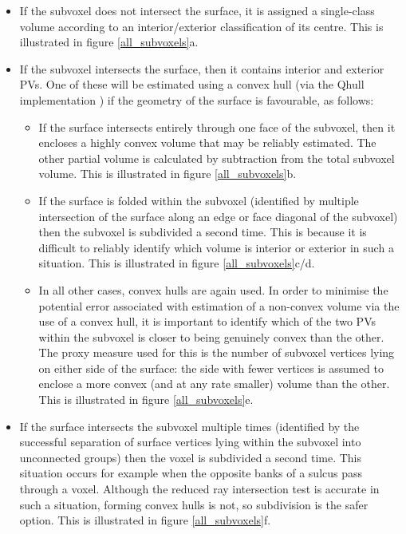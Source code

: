 \documentclass[12pt]{report}
\begin{document}
\begin{itemize}
\item If the subvoxel does not intersect the surface, it is assigned a single-class volume according to an interior/exterior classification of its centre. This is illustrated in figure \ref{all_subvoxels}a. 

\item If the subvoxel intersects the surface, then it contains interior and exterior PVs. One of these will be estimated using a convex hull (via the Qhull implementation \cite{Barber:1996:QAC:235815.235821}) if the geometry of the surface is favourable, as follows:

\begin{itemize}
\item If the surface intersects entirely through one face of the subvoxel, then it encloses a highly convex volume that may be reliably estimated. The other partial volume is calculated by subtraction from the total subvoxel volume. This is illustrated in figure \ref{all_subvoxels}b. 
\item If the surface is folded within the subvoxel (identified by multiple intersection of the surface along an edge or face diagonal of the subvoxel) then the subvoxel is subdivided a second time. This is because it is difficult to reliably identify which volume is interior or exterior in such a situation. This is illustrated in figure \ref{all_subvoxels}c/d. 
\item In all other cases, convex hulls are again used. In order to minimise the potential error associated with estimation of a non-convex volume via the use of a convex hull, it is important to identify which of the two PVs within the subvoxel is closer to being genuinely convex than the other. The proxy measure used for this is the number of subvoxel vertices lying on either side of the surface: the side with fewer vertices is assumed to enclose a more convex (and at any rate smaller) volume than the other. This is illustrated in figure \ref{all_subvoxels}e.
\end{itemize}

\item If the surface intersects the subvoxel multiple times (identified by the successful separation of surface vertices lying within the subvoxel into unconnected groups) then the voxel is subdivided a second time. This situation occurs for example when the opposite banks of a sulcus pass through a voxel. Although the reduced ray intersection test is accurate in such a situation, forming convex hulls is not, so subdivision is the safer option. This is illustrated in figure \ref{all_subvoxels}f. 
\end{itemize}
\end{document}
